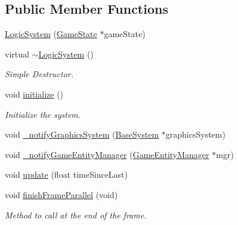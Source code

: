 \subsection*{Public Member Functions}
\begin{DoxyCompactItemize}
\item 
\hyperlink{class_common_1_1_logic_system_a414d0489e458dea69dd8386fd556acc2}{Logic\+System} (\hyperlink{class_common_1_1_game_state}{Game\+State} $\ast$game\+State)
\item 
\mbox{\label{class_common_1_1_logic_system_aab74dcdd9856b3185ec19cfa2887992d}} 
virtual \hyperlink{class_common_1_1_logic_system_aab74dcdd9856b3185ec19cfa2887992d}{$\sim$\+Logic\+System} ()
\begin{DoxyCompactList}\small\item\em Simple Destructor. \end{DoxyCompactList}\item 
\mbox{\label{class_common_1_1_logic_system_a6e1389a1e2ed8dd21b46fabdedee5d22}} 
void \hyperlink{class_common_1_1_logic_system_a6e1389a1e2ed8dd21b46fabdedee5d22}{initialize} ()
\begin{DoxyCompactList}\small\item\em Initialize the system. \end{DoxyCompactList}\item 
void \hyperlink{class_common_1_1_logic_system_a0897460fb4f985b0bd85c2d130b9d585}{\+\_\+notify\+Graphics\+System} (\hyperlink{class_common_1_1_base_system}{Base\+System} $\ast$graphics\+System)
\item 
void \hyperlink{class_common_1_1_logic_system_a5eb233fa1e610dbf2b52a76d06ce9782}{\+\_\+notify\+Game\+Entity\+Manager} (\hyperlink{class_common_1_1_game_entity_manager}{Game\+Entity\+Manager} $\ast$mgr)
\item 
void \hyperlink{class_common_1_1_logic_system_a8f11d71f1f95adbb95dcb6c4281d699a}{update} (float time\+Since\+Last)
\item 
\mbox{\label{class_common_1_1_logic_system_a4aeed6252b67c4213bd2ba0ca2a6e39c}} 
void \hyperlink{class_common_1_1_logic_system_a4aeed6252b67c4213bd2ba0ca2a6e39c}{finish\+Frame\+Parallel} (void)
\begin{DoxyCompactList}\small\item\em Method to call at the end of the frame. \end{DoxyCompactList}\item 

\end{DoxyCompactItemize}

